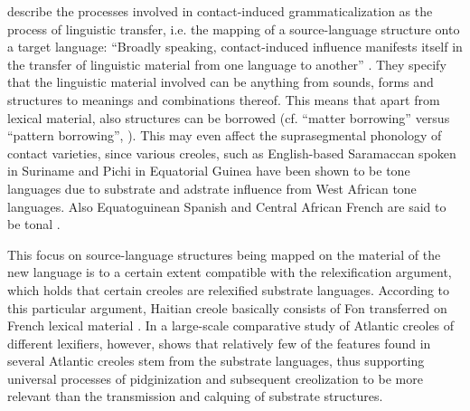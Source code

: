 \documentclass[output=paper,
modfonts
]{langscibook}
\begin{document}
\cite{heineetal2005language} describe the processes involved in contact-induced grammaticalization as the process of linguistic transfer, i.e. the mapping of a source-language structure onto a target language: “Broadly speaking, contact-induced influence manifests itself in the transfer of linguistic material from one language to another” \citep[2]{heineetal2005language}. They specify that the linguistic material involved can be anything from sounds, forms and structures to meanings and combinations thereof. This means that apart from lexical material, also structures can be borrowed (cf. “matter borrowing” versus “pattern borrowing”, \citealt{matras_grammatical_2007}). This may even affect the suprasegmental phonology of contact varieties, since various creoles, such as English-based Saramaccan spoken in Suriname \parencite{good2004tone} and Pichi in Equatorial Guinea \citep{yakpo2018grammar} have been shown to be tone languages due to substrate and adstrate influence from West African tone languages. Also Equatoguinean Spanish and Central African French are said to be tonal \citep{bordaletal2020}.

This focus on source-language structures being mapped on the material of the new language is to a certain extent compatible with the relexification argument, which holds that certain creoles are relexified substrate languages. According to this particular argument, Haitian creole basically consists of Fon transferred on French lexical material \citep{lefebvre1993role}. In a large-scale comparative study of Atlantic creoles of different lexifiers, however, \cite{parkvall2000out} shows that relatively few of the features found in several Atlantic creoles stem from the substrate languages, thus supporting universal processes of pidginization and subsequent creolization to be more relevant than the transmission and calquing of substrate structures.
\end{document}
